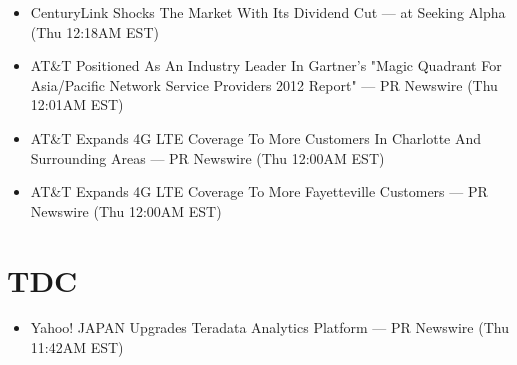 \documentclass[11pt,asymmetric]{article}
\begin{document}
\begin{itemize}
\item CenturyLink Shocks The Market With Its Dividend Cut --- at Seeking Alpha (Thu 12:18AM EST)
\item AT\&T Positioned As An Industry Leader In Gartner's "Magic Quadrant For Asia/Pacific Network Service Providers 2012 Report" --- PR Newswire (Thu 12:01AM EST)
\item AT\&T Expands 4G LTE Coverage To More Customers In Charlotte And Surrounding Areas --- PR Newswire (Thu 12:00AM EST)
\item AT\&T Expands 4G LTE Coverage To More Fayetteville Customers --- PR Newswire (Thu 12:00AM EST)
\end{itemize}

\section*{TDC}
\begin{itemize}
\item Yahoo! JAPAN Upgrades Teradata Analytics Platform --- PR Newswire (Thu 11:42AM EST)
\end{itemize}
\end{document}
